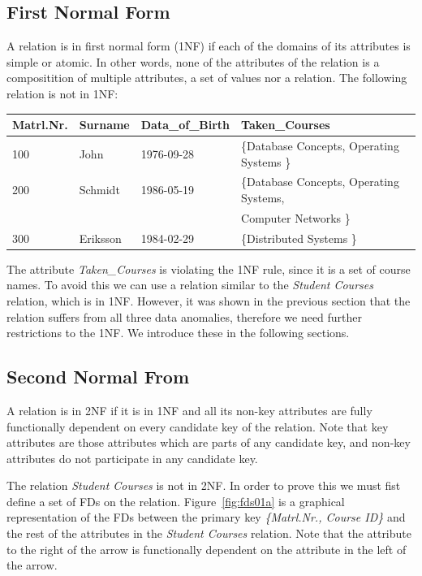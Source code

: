 \subsection{First Normal Form} 
A relation is in first normal form (1NF) if each of
the domains of its attributes is simple or atomic. 
In other words, none of the attributes of the relation is a compositition of multiple attributes, 
a set of values nor a relation. The following relation is not in 1NF:

\begin{center}
\begin{tabular}[h]{|l|l|l|l|}
  \hline
  Matrl.Nr. & Surname & Data\_of\_Birth & Taken\_Courses \\ \hline
  100 & John & 1976-09-28 & \{Database Concepts, Operating Systems \} \\  
  200 & Schmidt & 1986-05-19 & \{Database Concepts, Operating Systems,  \\ 
      &         &            & Computer Networks \} \\
  300 & Eriksson & 1984-02-29 & \{Distributed Systems \} \\ \hline
\end{tabular}
\end{center}

The attribute \textit{Taken\_Courses} is violating the 1NF rule, since it is a set of 
course names. To avoid this we can use a relation similar to the \textit{Student Courses} relation,
which is in 1NF. However, it was shown in the previous section that the relation suffers
from all three data anomalies, therefore we need further restrictions to the 1NF. We
introduce these in the following sections.  

\subsection{Second Normal From}
A relation is in 2NF if it is in 1NF and all its non-key attributes are fully
functionally dependent on every candidate key of the relation.
Note that key attributes are those attributes which are parts of any 
candidate key, and non-key attributes do not participate in any candidate key. 

The relation \textit{Student Courses} is not in 2NF. In order to prove this we must
fist define a set of FDs on the relation. Figure~\ref{fig:fds01a} is a graphical representation 
of the FDs between the primary key \textit{\{Matrl.Nr., Course ID\}} and the rest of the 
attributes in the \textit{Student Courses} relation. 
Note that the attribute to the right of the arrow is functionally dependent on the attribute 
in the left of the arrow.  

